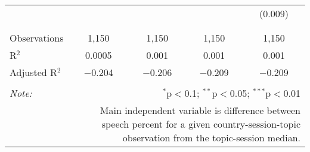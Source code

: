 \begin{table}[!htbp]
\begin{tabular}{@{\extracolsep{5pt}}lcccc}
  &  &  &  & (0.009) \\ 
  & & & & \\ 
\hline \\[-1.8ex] 
Observations & 1,150 & 1,150 & 1,150 & 1,150 \\ 
R$^{2}$ & 0.0005 & 0.001 & 0.001 & 0.001 \\ 
Adjusted R$^{2}$ & $-$0.204 & $-$0.206 & $-$0.209 & $-$0.209 \\ 
\hline 
\hline \\[-1.8ex] 
\textit{Note:}  & \multicolumn{4}{r}{$^{*}$p$<$0.1; $^{**}$p$<$0.05; $^{***}$p$<$0.01} \\ 
 & \multicolumn{4}{r}{Main independent variable is difference between speech percent for a given country-session-topic observation from the topic-session median.} \\ 
\end{tabular} 
\end{table} 
